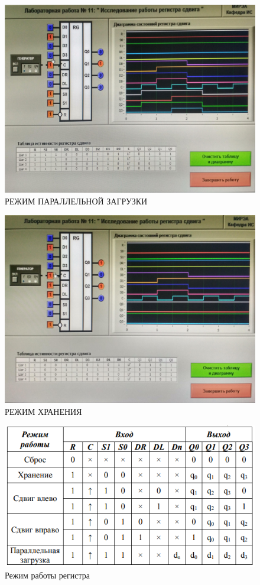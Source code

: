 \begin{figure}[H]
	\centering
	\includegraphics[width=0.95\linewidth]{imgs/11/3.jpg}
	\caption{РЕЖИМ ПАРАЛЛЕЛЬНОЙ ЗАГРУЗКИ}
	\label{fig:11_3}
\end{figure}

\begin{figure}[H]
	\centering
	\includegraphics[width=0.95\linewidth]{imgs/11/4.jpg}
	\caption{РЕЖИМ ХРАНЕНИЯ}
	\label{fig:11_4}
\end{figure}


\begin{figure}[H]
	\centering
	\includegraphics[width=0.85\linewidth]{imgs/11/11_tab}
	\caption{Режим работы регистра}
	\label{fig:11_tab}
\end{figure}

